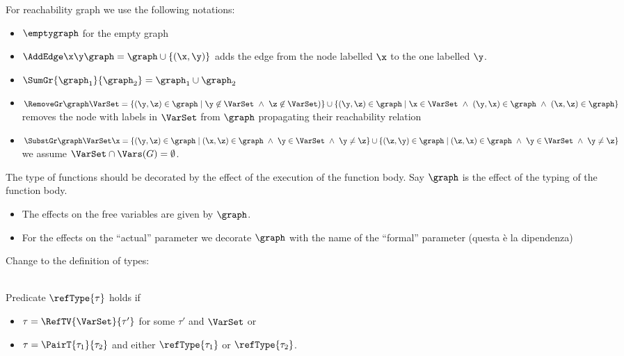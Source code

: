For reachability graph we use the following notations:
\begin{itemize}
\item $\emptygraph$ for the empty graph
  \item $\AddEdge\x\y\graph=\graph\cup\{(\x,\y)\}$ adds the edge from the node labelled $\x$ to the one labelled $\y$. 
  \item $\SumGr{\graph_1}{\graph_2}=\graph_1\cup\graph_2$ 
  \item $\RemoveGr\graph\VarSet=\{(\y,\z)\in\graph\mid\y\not\in\VarSet\ \wedge\ \z\not\in\VarSet)\}\cup\{(\y,\z)\in\graph\mid\x\in\VarSet\ \wedge\ (\y,\x)\in\graph\ \wedge\ (\x,\z)\in\graph\}$ removes the node with labels in $\VarSet$ from $\graph$ propagating their reachability relation
  \item $\SubstGr\graph\VarSet\x=\{(\y,\z)\in\graph\mid(\x,\z)\in\graph\ \wedge\ \y\in\VarSet\ \wedge\ \y\neq\z\}\cup\{(\z,\y)\in\graph\mid(\z,\x)\in\graph\ \wedge\ \y\in\VarSet\ \wedge\ \y\neq\z\}$ we assume  $\VarSet\cap\Vars(G)=\emptyset$.
  \end{itemize}
  The type of functions should be decorated by the effect of the execution of the function body. Say $\graph$ is the effect of the typing of the function body. 
  \begin{itemize}
  \item The effects on the free variables are given by $\graph$.
  \item For the effects on the ``actual'' parameter we decorate $\graph$ with the name of the ``formal'' parameter (questa \`e la dipendenza)
 \end{itemize}
Change to the definition of types:

\begin{grammatica} 
\end{grammatica}
\\
Predicate $\refType{\tau}$ holds if 
\begin{itemize}
\item $\tau=\RefTV{\VarSet}{\tau'}$ for some $\tau'$ and $\VarSet$ or
\item $\tau={\PairT{\tau_1}{\tau_2}}$ and either $\refType{\tau_1}$ or $\refType{\tau_2}$.
 \end{itemize}
 
